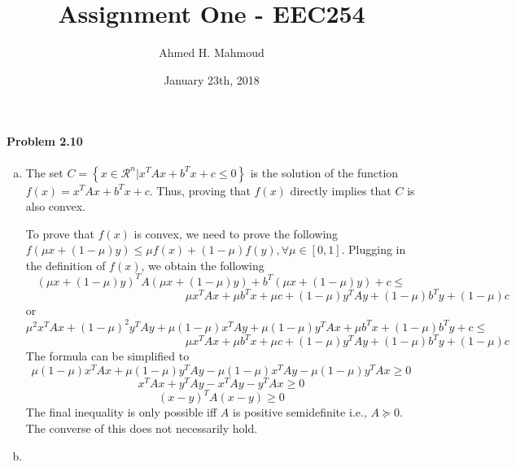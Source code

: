 \documentclass[12pt] {article}
\begin{document}
\title{Assignment One -  EEC254}
\author{Ahmed H. Mahmoud}
\date{January 23th, 2018}
\maketitle




\paragraph{Problem 2.10} 
\begin{enumerate}[(a)]
\item The set $C = \left\lbrace x\in \mathcal{R}^n | x^{T}Ax + b^{T}x + c \leq 0 \right\rbrace$ is the solution of the function $f(x) = x^{T}Ax + b^{T}x + c$. Thus, proving that $f(x)$ directly implies that $C$ is also convex. 

To prove that $f(x)$ is convex, we need to prove the following $f(\mu x + (1-\mu)y) \leq \mu f(x) + (1-\mu)f(y), \forall \mu \in \left[0,1\right]$. Plugging in the definition of $f(x)$, we obtain the following 
$$
(\mu x + (1-\mu)y)^{T}A(\mu x + (1-\mu)y) + b^{T}(\mu x + (1-\mu)y) + c \leq  
$$
$$
\qquad \qquad \qquad \qquad \qquad \qquad \qquad \mu x^{T}Ax + \mu b^{T}x + \mu c + (1-\mu) y^{T}A y + (1-\mu) b^{T}y + (1-\mu) c 
$$
or 
$$
\mu^{2}x^{T}A x + (1-\mu)^{2}y^{T}A y + \mu(1-\mu)x^{T}A y + \mu(1-\mu)y^{T}A x + \mu b^{T} x + (1- \mu) b^{T} y + c \leq
$$
$$
\qquad \qquad \qquad \qquad \qquad \qquad \qquad \mu x^{T}A x + \mu  b^{T} x + \mu c + (1-\mu) y^{T}A y + (1-\mu) b^{T} y + (1-\mu) c
$$
The formula can be simplified to 
$$
\mu (1-\mu) x^{T} A x + \mu (1-\mu) y^{T} A y - \mu (1-\mu) x^{T}A y - \mu(1-\mu)y^{T}A x \geq 0
$$
$$
x^{T}Ax + y^{T}Ay - x^{T}Ay - y^{T}A x \geq 0
$$
$$
(x-y)^{T}A(x-y) \geq 0
$$
The final inequality is only possible iff $A$ is positive semidefinite i.e., $A \succeq 0$. The converse of this does not necessarily hold. 

\item 




\end{enumerate}
\end{document}
